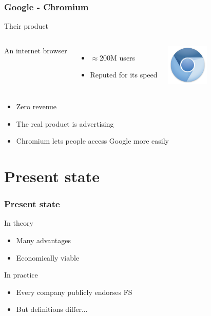 \documentclass{beamer}
\begin{document}
\begin{frame}

  \frametitle{Google - Chromium}

  \begin{block}{Their product}
    \begin{columns}[c]

      An internet browser
      \begin{itemize}
        \item{$\approx 200$M users}
        \item{Reputed for its speed}
      \end{itemize}

      \includegraphics[width=2cm]{logo_chromium.png}

    \end{columns}
  \end{block}

  \vfill

  \begin{itemize}
    \item<2->{Zero revenue}
    \item<3->{The real product is advertising}
    \item<4>{Chromium lets people access Google more easily}
  \end{itemize}

\end{frame}

\section{Present state}

\begin{frame}

  \frametitle{Present state}

  \begin{block}{In theory}
    \begin{itemize}
      \item{Many advantages}
      \item{Economically viable}
    \end{itemize}
  \end{block}

  \vfill

  \begin{block}{In practice}
    \begin{itemize}
      \item<2->{Every company publicly endorses FS}
      \item<3->{But definitions differ...}
    \end{itemize}
  \end{block}

\end{frame}
\end{document}
